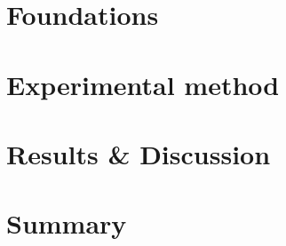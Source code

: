 \part{Foundations}
\pagebreak


\pagebreak
\part{Experimental method}
\pagebreak


\pagebreak
\part{Results \& Discussion}
\pagebreak


\pagebreak
\part{Summary}
\pagebreak


\pagebreak
\printbibliography
\pagebreak

\listoffigures
\listoftables

%






